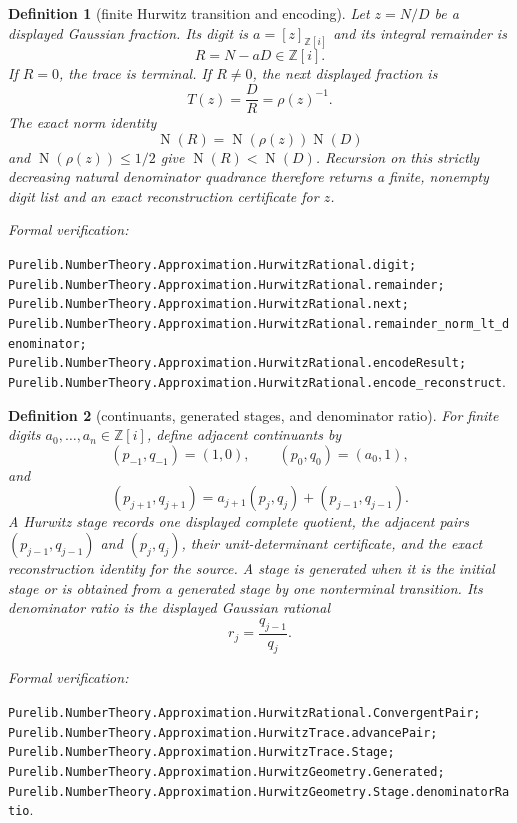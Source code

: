 \documentclass[11pt]{article}
\newtheorem{definition}[definition]{Definition}
\newcommand{\Zi}{\mathbb{Z}[i]}
\newcommand{\Norm}[1]{\operatorname{N}\!\left(#1\right)}
\newcommand{\leanref}[1]{\par\smallskip\noindent
  \emph{Formal verification:}\par\nobreak
  {\raggedright\nolinkurl{#1}.\par}}
\begin{document}
\begin{definition}[finite Hurwitz transition and encoding]
\label{def:finite-hurwitz-transition}
Let $z=N/D$ be a displayed Gaussian fraction.  Its digit is
$a=[z]_{\Zi}$ and its integral remainder is
\[
                           R=N-aD\in\Zi.
\]
If $R=0$, the trace is terminal.  If $R\ne0$, the next displayed fraction is
\[
                         T(z)=\frac{D}{R}
                             =\rho(z)^{-1}.
\]
The exact norm identity
\[
                   \Norm R=\Norm{\rho(z)}\Norm D
\]
and $\Norm{\rho(z)}\le1/2$ give $\Norm R<\Norm D$.  Recursion on this
strictly decreasing natural denominator quadrance therefore returns a finite,
nonempty digit list and an exact reconstruction certificate for $z$.
\end{definition}

\leanref{Purelib.NumberTheory.Approximation.HurwitzRational.digit;
Purelib.NumberTheory.Approximation.HurwitzRational.remainder;
Purelib.NumberTheory.Approximation.HurwitzRational.next;
Purelib.NumberTheory.Approximation.HurwitzRational.remainder_norm_lt_denominator;
Purelib.NumberTheory.Approximation.HurwitzRational.encodeResult;
Purelib.NumberTheory.Approximation.HurwitzRational.encode_reconstruct}

\begin{definition}[continuants, generated stages, and denominator ratio]
\label{def:hurwitz-stage}
For finite digits $a_0,\ldots,a_n\in\Zi$, define adjacent continuants by
\[
 (p_{-1},q_{-1})=(1,0),\qquad (p_0,q_0)=(a_0,1),
\]
and
\begin{equation}
\label{eq:continuant-recurrence}
 (p_{j+1},q_{j+1})=
 a_{j+1}(p_j,q_j)+(p_{j-1},q_{j-1}).
\end{equation}
A \emph{Hurwitz stage} records one displayed complete quotient, the adjacent
pairs $(p_{j-1},q_{j-1})$ and $(p_j,q_j)$, their unit-determinant
certificate, and the exact reconstruction identity for the source.  A stage
is \emph{generated} when it is the initial stage or is obtained from a
generated stage by one nonterminal transition.  Its \emph{denominator ratio}
is the displayed Gaussian rational
\begin{equation}
\label{eq:denominator-ratio}
                         r_j=\frac{q_{j-1}}{q_j}.
\end{equation}
\end{definition}

\leanref{Purelib.NumberTheory.Approximation.HurwitzRational.ConvergentPair;
Purelib.NumberTheory.Approximation.HurwitzTrace.advancePair;
Purelib.NumberTheory.Approximation.HurwitzTrace.Stage;
Purelib.NumberTheory.Approximation.HurwitzGeometry.Generated;
Purelib.NumberTheory.Approximation.HurwitzGeometry.Stage.denominatorRatio}
\end{document}
